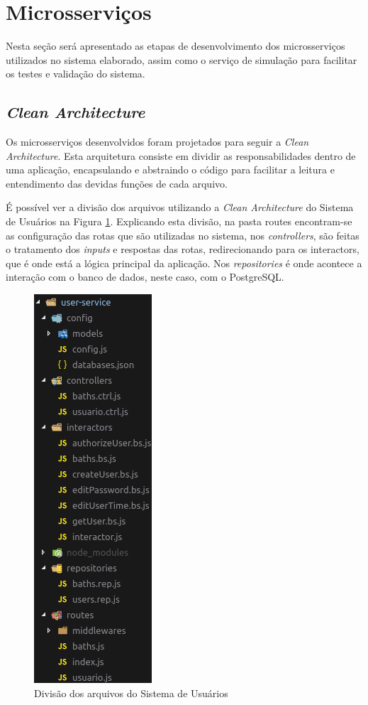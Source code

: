 \section{Microsserviços}

Nesta seção será apresentado as etapas de desenvolvimento dos microsserviços utilizados no sistema elaborado, assim como o serviço de simulação para facilitar os testes e validação do sistema.

\subsection{\textit{Clean Architecture}}

Os microsserviços desenvolvidos foram projetados para seguir a \textit{Clean Architecture}. Esta arquitetura consiste em dividir as responsabilidades dentro de uma aplicação, encapsulando e abstraindo o código para facilitar a leitura e entendimento das devidas funções de cada arquivo.

É possível ver a divisão dos arquivos utilizando a \textit{Clean Architecture} do Sistema de Usuários na Figura \ref{fig:clean}. Explicando esta divisão, na pasta routes encontram-se as configuração das rotas que são utilizadas no sistema, nos \textit{controllers}, são feitas o tratamento dos \textit{inputs} e respostas das rotas, redirecionando para os interactors, que é onde está a lógica principal da aplicação. Nos \textit{repositories} é onde acontece a interação com o banco de dados, neste caso, com o PostgreSQL.

\begin{figure}[htbp]
	\centering
	\includegraphics[width=0.25\linewidth]{figuras/cleanarch.png}
	\caption{Divisão dos arquivos do Sistema de Usuários}
	\label{fig:clean}
\end{figure}


